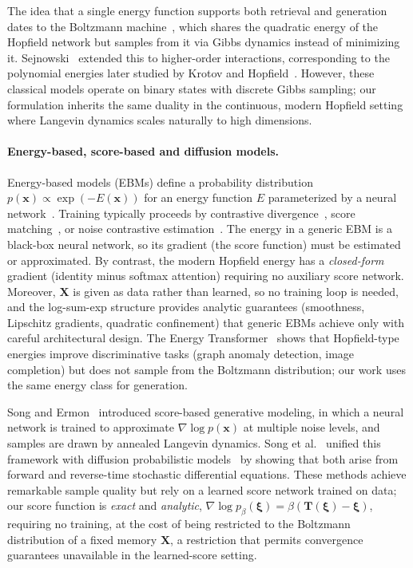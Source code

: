 The idea that a single energy function supports both retrieval and generation dates to the Boltzmann machine~\cite{ackeleyLearningAlgorithmBoltzmann1985}, which shares the quadratic energy of the Hopfield network but samples from it via Gibbs dynamics instead of minimizing it. Sejnowski~\cite{sejnowskiHigherOrderBoltzmann1986} extended this to higher-order interactions, corresponding to the polynomial energies later studied by Krotov and Hopfield~\cite{krotovDenseAssociativeMemory2016}. However, these classical models operate on binary states with discrete Gibbs sampling; our formulation inherits the same duality in the continuous, modern Hopfield setting where Langevin dynamics scales naturally to high dimensions.

\paragraph{Energy-based, score-based and diffusion models.}
Energy-based models (EBMs) define a probability distribution $p(\mathbf{x})\propto\exp(-E(\mathbf{x}))$ for an energy function $E$ parameterized by a neural network~\cite{lecunTutorialEnergyBased2006}. Training typically proceeds by contrastive divergence~\cite{hintonTrainingProductsExperts2002}, score matching~\cite{hyvarinen2005estimation}, or noise contrastive estimation~\cite{gutmannHyvaerinenNoiseContrastive2010,songHowTrainEnergyBased2021}. The energy in a generic EBM is a black-box neural network, so its gradient (the score function) must be estimated or approximated. By contrast, the modern Hopfield energy has a \emph{closed-form} gradient (identity minus softmax attention) requiring no auxiliary score network. Moreover, $\mathbf{X}$ is given as data rather than learned, so no training loop is needed, and the log-sum-exp structure provides analytic guarantees (smoothness, Lipschitz gradients, quadratic confinement) that generic EBMs achieve only with careful architectural design. The Energy Transformer~\cite{hooverEnergyTransformer2024} shows that Hopfield-type energies improve discriminative tasks (graph anomaly detection, image completion) but does not sample from the Boltzmann distribution; our work uses the same energy class for generation.

Song and Ermon~\cite{songGenerativeModelingEstimating2019} introduced score-based generative modeling, in which a neural network is trained to approximate $\nabla\log p(\mathbf{x})$ at multiple noise levels, and samples are drawn by annealed Langevin dynamics. Song et al.~\cite{songScoreBasedGenerativeModeling2021} unified this framework with diffusion probabilistic models~\cite{hoDenoisingDiffusionProbabilistic2020,sohlDicksteinDeepUnsupervisedLearning2015} by showing that both arise from forward and reverse-time stochastic differential equations. These methods achieve remarkable sample quality but rely on a learned score network trained on data; our score function is \emph{exact} and \emph{analytic}, $\nabla\log p_\beta(\boldsymbol{\xi}) = \beta(\mathbf{T}(\boldsymbol{\xi})-\boldsymbol{\xi})$, requiring no training, at the cost of being restricted to the Boltzmann distribution of a fixed memory $\mathbf{X}$, a restriction that permits convergence guarantees unavailable in the learned-score setting.

